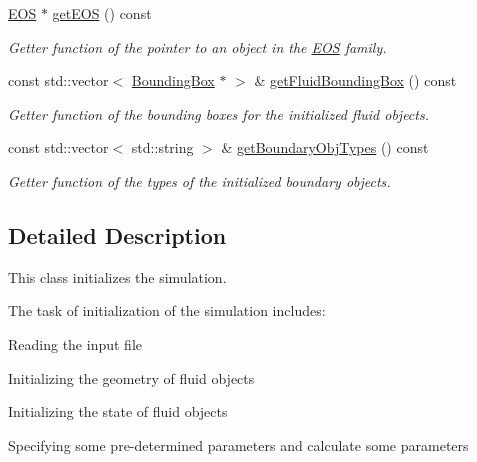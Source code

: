\begin{DoxyCompactItemize}
\hyperlink{classEOS}{E\-O\-S} $\ast$ \hyperlink{classInitializer_a20859e6765c50a0173b7f164c1962e6f}{get\-E\-O\-S} () const 
\begin{DoxyCompactList}\small\item\em Getter function of the pointer to an object in the \hyperlink{classEOS}{E\-O\-S} family. \end{DoxyCompactList}\item 
const std\-::vector$<$ \hyperlink{classBoundingBox}{Bounding\-Box} $\ast$ $>$ \& \hyperlink{classInitializer_ac7822b9561a21c40809738236b10bb91}{get\-Fluid\-Bounding\-Box} () const 
\begin{DoxyCompactList}\small\item\em Getter function of the bounding boxes for the initialized fluid objects. \end{DoxyCompactList}\item 
const std\-::vector$<$ std\-::string $>$ \& \hyperlink{classInitializer_ae0b5288020bb976927447d0da25a322c}{get\-Boundary\-Obj\-Types} () const 
\begin{DoxyCompactList}\small\item\em Getter function of the types of the initialized boundary objects. \end{DoxyCompactList}\end{DoxyCompactItemize}


\subsection{Detailed Description}
This class initializes the simulation. 

The task of initialization of the simulation includes\-:\par

\begin{DoxyEnumerate}
\item Reading the input file \par

\item Initializing the geometry of fluid objects\par

\item Initializing the state of fluid objects\par

\item Specifying some pre-\/determined parameters and calculate some parameters
\end{DoxyEnumerate}

